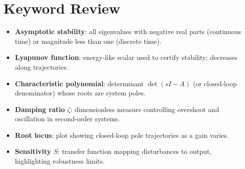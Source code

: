 \section{Keyword Review}
\begin{vocabulary}
\begin{itemize}[leftmargin=*]
    \item \textbf{Asymptotic stability}: all eigenvalues with negative real parts (continuous time) or magnitude less than one (discrete time).
    \item \textbf{Lyapunov function}: energy-like scalar used to certify stability; decreases along trajectories.
    \item \textbf{Characteristic polynomial}: determinant $\det(sI - A)$ (or closed-loop denominator) whose roots are system poles.
    \item \textbf{Damping ratio $\zeta$}: dimensionless measure controlling overshoot and oscillation in second-order systems.
    \item \textbf{Root locus}: plot showing closed-loop pole trajectories as a gain varies.
    \item \textbf{Sensitivity $S$}: transfer function mapping disturbances to output, highlighting robustness limits.
\end{itemize}
\end{vocabulary}
